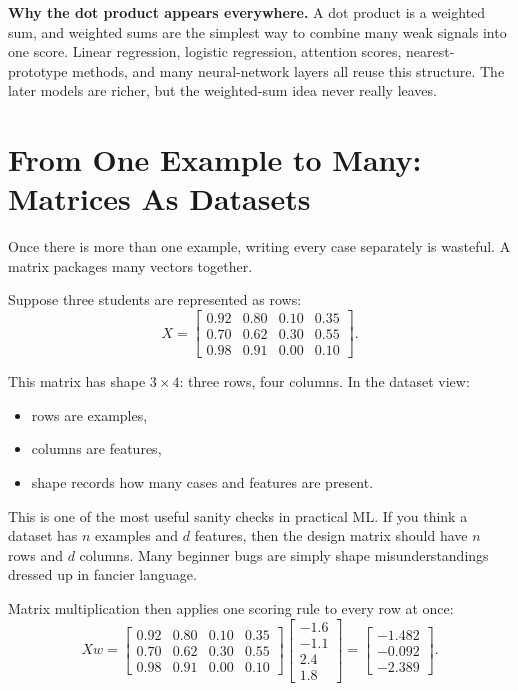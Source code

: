 \textbf{Why the dot product appears everywhere.} A dot product is a weighted sum, and weighted sums are the simplest way to combine many weak signals into one score. Linear regression, logistic regression, attention scores, nearest-prototype methods, and many neural-network layers all reuse this structure. The later models are richer, but the weighted-sum idea never really leaves.

\section*{From One Example to Many: Matrices As Datasets}

Once there is more than one example, writing every case separately is wasteful. A matrix packages many vectors together.

Suppose three students are represented as rows:
\[
X =
\begin{bmatrix}
0.92 & 0.80 & 0.10 & 0.35 \\
0.70 & 0.62 & 0.30 & 0.55 \\
0.98 & 0.91 & 0.00 & 0.10
\end{bmatrix}.
\]

This matrix has shape \(3 \times 4\): three rows, four columns. In the dataset view:

\begin{itemize}[leftmargin=*]
\item rows are examples,
\item columns are features,
\item shape records how many cases and features are present.
\end{itemize}

This is one of the most useful sanity checks in practical ML. If you think a dataset has \(n\) examples and \(d\) features, then the design matrix should have \(n\) rows and \(d\) columns. Many beginner bugs are simply shape misunderstandings dressed up in fancier language.

Matrix multiplication then applies one scoring rule to every row at once:
\[
Xw =
\begin{bmatrix}
0.92 & 0.80 & 0.10 & 0.35 \\
0.70 & 0.62 & 0.30 & 0.55 \\
0.98 & 0.91 & 0.00 & 0.10
\end{bmatrix}
\begin{bmatrix}
-1.6 \\
-1.1 \\
2.4 \\
1.8
\end{bmatrix}
=
\begin{bmatrix}
-1.482 \\
-0.092 \\
-2.389
\end{bmatrix}.
\]

